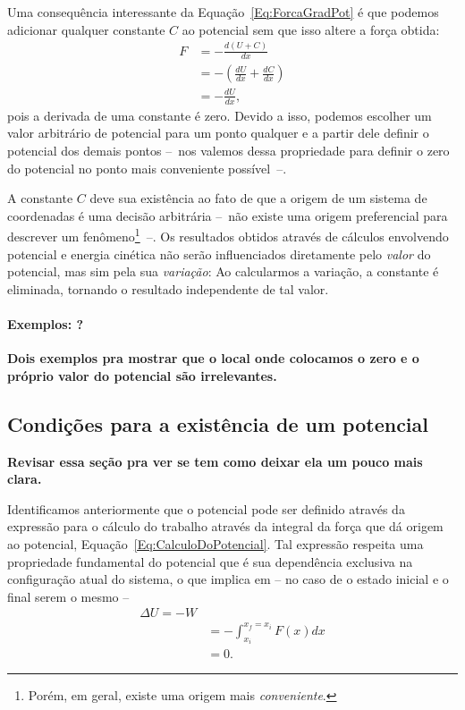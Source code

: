 Uma consequência interessante da Equação~\eqref{Eq:ForcaGradPot} é que podemos adicionar qualquer constante $C$ ao potencial sem que isso altere a força obtida:
\begin{align}
  F &= - \frac{d(U+C)}{dx} \\
  &= -\left(\frac{dU}{dx} + \frac{dC}{dx}\right) \\
  &= -\frac{dU}{dx},
\end{align}
%
pois a derivada de uma constante é zero. Devido a isso, podemos escolher um valor arbitrário de potencial para um ponto qualquer e a partir dele definir o potencial dos demais pontos --~nos valemos dessa propriedade para definir o zero do potencial no ponto mais conveniente possível~--.

A constante $C$ deve sua existência ao fato de que a origem de um sistema de coordenadas é uma decisão arbitrária --~não existe uma origem preferencial para descrever um fenômeno\footnote{Porém, em geral, existe uma origem mais \emph{conveniente}.}~--. Os resultados obtidos através de cálculos envolvendo potencial e energia cinética não serão influenciados diretamente pelo \emph{valor} do potencial, mas sim pela sua \emph{variação}: Ao calcularmos a variação, a constante é eliminada, tornando o resultado independente de tal valor.

\paragraph{Exemplos: ?}

\textbf{Dois exemplos pra mostrar que o local onde colocamos o zero e o próprio valor do potencial são irrelevantes.}

\subsection{Condições para a existência de um potencial}

\textbf{Revisar essa seção pra ver se tem como deixar ela um pouco mais clara.}

Identificamos anteriormente que o potencial pode ser definido através da expressão para o cálculo do trabalho através da integral da força que dá origem ao potencial, Equação~\eqref{Eq:CalculoDoPotencial}. Tal expressão respeita uma propriedade fundamental do potencial que é sua dependência exclusiva na configuração atual do sistema, o que implica em -- no caso de o estado inicial e o final serem o mesmo --
\begin{align}
  \Delta U = - W \\
  &= -\int_{x_i}^{x_f=x_i} F(x) dx \\
  &= 0.
\end{align}

